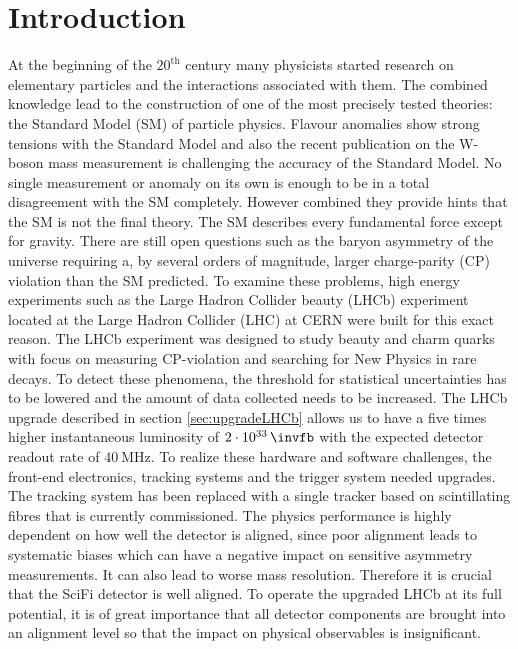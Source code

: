 \chapter{Introduction}
\label{sec:einleitung}

At the beginning of the $20^{\text{th}}$ century many physicists started research on
elementary particles and the interactions associated with them. The combined
knowledge lead to the construction of one of the most precisely tested theories: the Standard Model (SM) of particle physics.
Flavour anomalies show strong tensions with the Standard Model and also the recent publication on the W-boson mass measurement is challenging the accuracy of the Standard Model\cite{wmass}.
No single measurement or anomaly on its own is enough to be in a total disagreement with the SM completely. However combined they provide hints that the SM is not the final theory.
The SM describes every fundamental force except for gravity. There are still open questions such as the baryon asymmetry of the universe requiring a, by several orders of magnitude, larger charge-parity (CP) violation than the SM predicted.
To examine these problems, high energy experiments such as the Large Hadron Collider beauty (LHCb) experiment located at the Large Hadron Collider (LHC) at CERN were built for this exact reason.
The LHCb experiment was designed to study beauty and charm quarks with focus on measuring CP-violation and searching for New Physics in rare decays.
To detect these phenomena, the threshold for statistical uncertainties has to
be lowered and the amount of data collected needs to be increased. The LHCb upgrade described in section \ref{sec:upgradeLHCb} allows us to have a five times higher instantaneous luminosity of $\SI{2e33}{\invfb}$ with the expected detector readout rate of $\SI{40}{\mega\hertz}$.
To realize these hardware and software challenges, the front-end electronics, tracking systems and the trigger system needed upgrades.
The tracking system has been replaced with a single tracker based on scintillating fibres that is currently commissioned. The physics performance is highly dependent on how well the detector is aligned, since poor alignment leads to systematic biases which can have a negative impact on sensitive asymmetry measurements. It can also lead to worse mass resolution. Therefore it is crucial that the SciFi detector is well aligned.
To operate the upgraded LHCb at its full potential, it is of great importance that all detector components are brought into an alignment level so that the impact on physical observables is insignificant.
